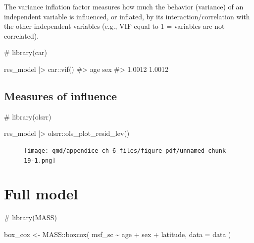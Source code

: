 \documentclass[
  12pt,
  a4paper,
  oneside]{tesesusp}
\newenvironment{Shaded}{\begin{snugshade}}{\end{snugshade}}
\newcommand{\AttributeTok}[1]{\textcolor[rgb]{0.40,0.45,0.13}{#1}}
\newcommand{\CommentTok}[1]{\textcolor[rgb]{0.37,0.37,0.37}{#1}}
\newcommand{\FunctionTok}[1]{\textcolor[rgb]{0.28,0.35,0.67}{#1}}
\newcommand{\NormalTok}[1]{\textcolor[rgb]{0.00,0.23,0.31}{#1}}
\newcommand{\OtherTok}[1]{\textcolor[rgb]{0.00,0.23,0.31}{#1}}
\newcommand{\SpecialCharTok}[1]{\textcolor[rgb]{0.37,0.37,0.37}{#1}}
\begin{document}
The variance inflation factor measures how much the behavior (variance)
of an independent variable is influenced, or inflated, by its
interaction/correlation with the other independent variables (e.g., VIF
equal to 1 = variables are not correlated).

\begin{Shaded}
\begin{Highlighting}[numbers=left,,]
\CommentTok{\# library(car)}

\NormalTok{res\_model }\SpecialCharTok{|\textgreater{}}\NormalTok{ car}\SpecialCharTok{::}\FunctionTok{vif}\NormalTok{()}
\CommentTok{\#\textgreater{}    age    sex }
\CommentTok{\#\textgreater{} 1.0012 1.0012}
\end{Highlighting}
\end{Shaded}

\hypertarget{measures-of-influence}{%
\subsection{Measures of influence}\label{measures-of-influence}}

\begin{Shaded}
\begin{Highlighting}[numbers=left,,]
\CommentTok{\# library(olsrr)}

\NormalTok{res\_model }\SpecialCharTok{|\textgreater{}}\NormalTok{ olsrr}\SpecialCharTok{::}\FunctionTok{ols\_plot\_resid\_lev}\NormalTok{()}
\end{Highlighting}
\end{Shaded}

\begin{figure}[H]

{\centering \texttt{[image: qmd/appendice-ch-6\_files/figure-pdf/unnamed-chunk-19-1.png]}

}

\end{figure}

\hypertarget{full-model}{%
\section{Full model}\label{full-model}}

\begin{Shaded}
\begin{Highlighting}[numbers=left,,]
\CommentTok{\# library(MASS)}

\NormalTok{box\_cox }\OtherTok{\textless{}{-}}\NormalTok{ MASS}\SpecialCharTok{::}\FunctionTok{boxcox}\NormalTok{(}
\NormalTok{  msf\_sc }\SpecialCharTok{\textasciitilde{}}\NormalTok{ age }\SpecialCharTok{+}\NormalTok{ sex }\SpecialCharTok{+}\NormalTok{ latitude, }\AttributeTok{data =}\NormalTok{ data}
\NormalTok{  )}
\end{Highlighting}
\end{Shaded}
\end{document}
